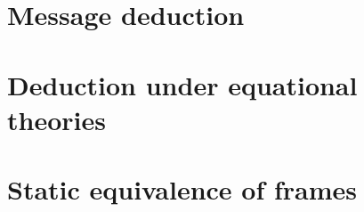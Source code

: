 \documentclass{article}
\begin{document}
    \section{Message deduction}
    

    \section{Deduction under equational theories}
    

    \section{Static equivalence of frames}
    
\end{document}
